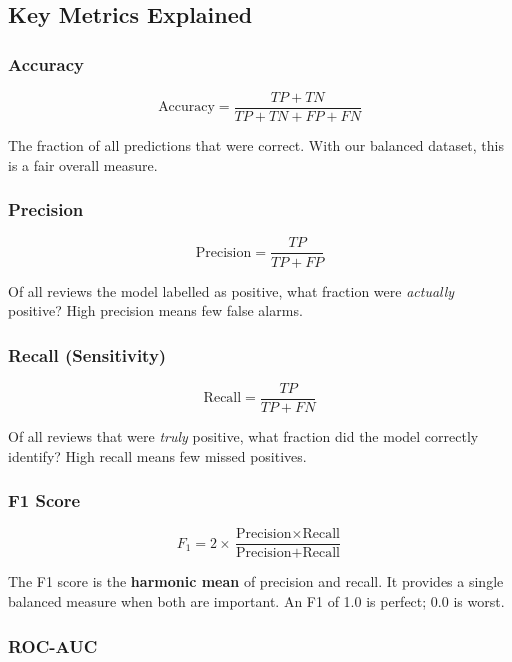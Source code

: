 \documentclass[12pt, a4paper]{article}
\begin{document}
\subsection{Key Metrics Explained}

\subsubsection{Accuracy}

\[
\text{Accuracy} = \frac{TP + TN}{TP + TN + FP + FN}
\]

The fraction of all predictions that were correct. With our balanced dataset, this is a fair overall measure.

\subsubsection{Precision}

\[
\text{Precision} = \frac{TP}{TP + FP}
\]

Of all reviews the model labelled as positive, what fraction were \emph{actually} positive? High precision means few false alarms.

\subsubsection{Recall (Sensitivity)}

\[
\text{Recall} = \frac{TP}{TP + FN}
\]

Of all reviews that were \emph{truly} positive, what fraction did the model correctly identify? High recall means few missed positives.

\subsubsection{F1 Score}

\[
F_1 = 2 \times \frac{\text{Precision} \times \text{Recall}}{\text{Precision} + \text{Recall}}
\]

The F1 score is the \textbf{harmonic mean} of precision and recall. It provides a single balanced measure when both are important. An F1 of 1.0 is perfect; 0.0 is worst.

\subsubsection{ROC-AUC}
\end{document}
